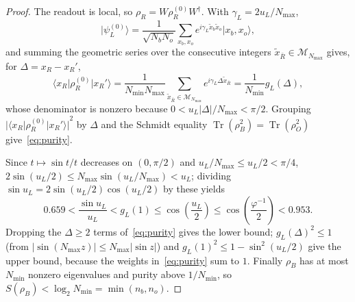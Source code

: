 \documentclass[11pt,a4paper]{article}
\theoremstyle{plain}
\theoremstyle{definition}
\theoremstyle{remark}
\newcommand{\Tr}{\operatorname{Tr}}
\newcommand{\ket}[1]{\lvert#1\rangle}
\newcommand{\bra}[1]{\langle#1\rvert}
\begin{document}
\begin{proof}
  The readout is local, so \( \rho_R = W \rho_R^{(0)} W^\dagger \). With
  \( \gamma_L = 2 u_L / N_{\max} \),
  \[
    \ket{\psi_L^{(0)}} = \frac{1}{\sqrt{N_b N_o}} \sum_{x_b, x_o}
    e^{i\gamma_L \tilde{x}_b \tilde{x}_o} \ket{x_b, x_o},
  \]
  and summing the geometric series over the consecutive integers
  \( \tilde{x}_{\bar{R}} \in \mathcal{M}_{N_{\max}} \) gives, for \( \Delta = x_R - x_R' \),
  \[
    \bra{x_R}\rho_R^{(0)}\ket{x_R'} = \frac{1}{N_{\min} N_{\max}}
    \sum_{\tilde{x}_{\bar{R}} \in \mathcal{M}_{N_{\max}}} e^{i \gamma_L \Delta \tilde{x}_{\bar{R}}} =
    \frac{1}{N_{\min}} g_L(\Delta),
  \]
  whose denominator is nonzero because \( 0 < u_L \lvert \Delta \rvert / N_{\max} < \pi / 2 \).
  Grouping \( {\lvert \bra{x_R}\rho_R^{(0)}\ket{x_R'} \rvert}^2 \) by \( \Delta \) and the Schmidt
  equality \( \Tr(\rho_B^2) = \Tr(\rho_O^2) \)~\cite{NielsenChuang} give~\eqref{eq:purity}.

  Since \( t \mapsto \sin t / t \) decreases on \( (0, \pi / 2) \) and
  \( u_L / N_{\max} \le u_L / 2 < \pi / 4 \),
  \( 2\sin(u_L / 2) \le N_{\max} \sin(u_L / N_{\max}) < u_L \); dividing
  \( \sin u_L = 2\sin(u_L / 2)\cos(u_L / 2) \) by these yields
  \[
    0.659 < \frac{\sin u_L}{u_L} < g_L(1) \le \cos\left(\frac{u_L}{2}\right) \le
    \cos\left(\frac{\varphi^{-1}}{2}\right) < 0.953.
  \]
  Dropping the \( \Delta \ge 2 \) terms of~\eqref{eq:purity} gives the lower bound;
  \( {g_L(\Delta)}^2 \le 1 \) (from \( \lvert \sin(N_{\max} z) \rvert \le N_{\max}
  \lvert \sin z \rvert \)) and \( {g_L(1)}^2 \le 1 - \sin^2(u_L / 2) \) give the upper bound,
  because the weights in~\eqref{eq:purity} sum to \( 1 \). Finally \( \rho_B \) has at most
  \( N_{\min} \) nonzero eigenvalues and purity above \( 1 / N_{\min} \), so
  \( S(\rho_B) < \log_2 N_{\min} = \min(n_b, n_o) \).
\end{proof}
\end{document}
